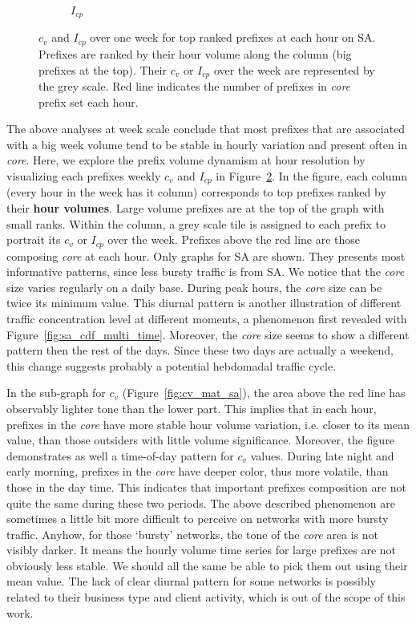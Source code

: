 \begin{figure}
\begin{subfigure}[b]{0.85\textwidth}
                \caption{$I_{cp}$}
                \label{fig:cp_mat_sa}
        \end{subfigure}
\caption{$c_v$ and $I_{cp}$ over one week for top ranked prefixes at each hour on SA. Prefixes are ranked by their hour volume along the column (big prefixes at the top). Their $c_v$ or $I_{cp}$ over the week are represented by the grey scale. Red line indicates the number of prefixes in \textit{core} prefix set each hour.}
\label{fig:cv_cp_mat}
\end{figure}

The above analyses at week scale conclude that most prefixes that are associated with a big week volume  tend to be stable in hourly variation and present often in \textit{core}.
Here, we explore the prefix volume dynamism at hour resolution by visualizing each prefixes weekly $c_v$ and $I_{cp}$ in Figure~\ref{fig:cv_cp_mat}.
In the figure, each column (every hour in the week has it column) corresponds to top prefixes ranked by their \textbf{hour volumes}.
Large volume prefixes are at the top of the graph with small ranks.
Within the column, a grey scale tile is assigned to each prefix to portrait its $c_v$ or $I_{cp}$ over the week.
Prefixes above the red line are those composing \textit{core} at each hour.
Only graphs for SA are shown. 
They presents most informative patterns, since less bursty traffic is from SA.
We notice that the \textit{core} size varies regularly on a daily base.
During peak hours, the \textit{core} size can be twice its minimum value.
This diurnal pattern is another illustration of different traffic concentration level at different moments, a phenomenon first revealed with Figure~\ref{fig:sa_cdf_multi_time}.
Moreover, the \textit{core} size seems to show a different pattern then the rest of the days.
Since these two days are actually a weekend, this change suggests probably a potential hebdomadal traffic cycle.

In the sub-graph for $c_v$ (Figure~\ref{fig:cv_mat_sa}), the area above the red line has observably lighter tone than the lower part. 
This implies that in each hour, prefixes in the \textit{core} have more stable hour volume variation, i.e. closer to its mean value,  than those outsiders with little volume significance.
Moreover, the figure demonstrates as well a time-of-day pattern for $c_v$ values. 
During late night and early morning, prefixes in the \textit{core} have deeper color, thus more volatile, than those in the day time.
This indicates that important prefixes composition are not quite the same during these two periods.
The above described phenomenon are sometimes a little bit more difficult to perceive on networks with more bursty traffic. 
Anyhow, for those `bursty' networks, the tone of the \textit{core} area is not visibly darker.
It means the hourly volume time series for large prefixes are not obviously less stable.
We should all the same be able to pick them out using their mean value.
The lack of clear diurnal pattern for some networks is possibly related to their business type and client activity, which is out of the scope of this work.

